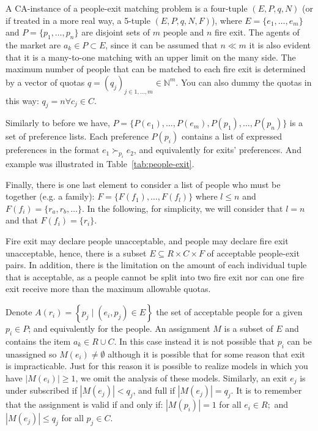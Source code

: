 \documentclass[letterpaper]{article} %
\begin{document}
    A CA-instance of a people-exit matching problem is a four-tuple \((E, P, q, N)\)
    (or if treated in a more real way, a 5-tuple \((E, P, q, N, F)\)), where
    \(E = \{e_1, \dots, e_m\}\) and \(P = \{p_1, \dots,p_n\}\) are disjoint sets of \(m\) people and \(n\) fire exit.
    The agents of the market are \(a_k \in P\subset E\), since it can be assumed that \(n \ll m\) it is also evident
    that it is a many-to-one matching with an upper limit  on the many side.
    The maximum number of people that can be matched to
    each fire exit is determined by a vector of quotas \(q = (q_j)_{j\in {1,...,m}} \in \mathbb{N}^m\).
    You can also dummy the quotas in this way:  \(q_j = n \forall c_j \in C\).

    Similarly to before we have, \(P = \{P(e_1), \dots , P(e_m), P(p_1), \dots , P(p_n)\}\) is
    a set of preference lists.
    Each preference \(P(p_i)\) contains a list of expressed preferences in the format
    \( e _ { 1 } \succ_{p _ { i }} e _ { 2 } \), and equivalently for exits' preferences.
    And example was illustrated in Table~\ref{tab:people-exit}.

    Finally, there is one last element to consider a list of people who must be together (e.g. a family):
    \(F=\{F(f_1), \dots, F(f_l)\}\) where \(l\leq n\) and \(F(f_i) = \{r_a, r_b, \dots\}\).
    In the following, for simplicity, we will consider that \(l=n\) and that \(F(f_i)=\{r_i\}\).

    Fire exit may declare people unacceptable, and people may declare fire exit unacceptable,
    hence, there is a subset \(E \subseteq R \times C \times F\) of acceptable people-exit pairs.
    In addition, there is the limitation on the amount of each individual tuple that is acceptable, as a people
    cannot be split into two fire exit nor can one fire exit receive more than the maximum allowable quotas.

    Denote \( A \left( r _ { i } \right) = \left\{ p _ { j } \mid \left( e _ { i } , p _ { j } \right) \in E \right\} \)
    the set of acceptable people for a given \( p _ { i } \in P \); and equivalently for the people.
    An assignment \(M\) is a subset of \(E\) and contains the item \( a _ { k } \in R \cup C \).
    In this case instead it is not possible that \( p _ { i } \) can be unassigned so
    \( M \left( e _ { i } \right) \neq \emptyset \) although it is possible that for some reason that exit is impracticable.
    Just for this reason it is possible to realize models in which you have \(|M \left( e _ { i } \right)| \geq 1\), we
    omit the analysis of these models.
    Similarly, an exit \( e _ { j } \) is  under subscribed if
    \( \left| M \left( e _ { j } \right) \right| < q _ { j } \), and full if
    \( \left| M \left( e _ { j } \right) \right| = q _ { j } \).
    It is to remember that the assignment is valid if and only if:
    \( \left| M \left( p _ { i } \right) \right| = 1 \) for all \( e _ { i } \in R ; \) and
    \( \left| M \left( e _ { j } \right) \right| \leq q _ { j } \) for all \( p _ { j } \in C  \).
\end{document}
